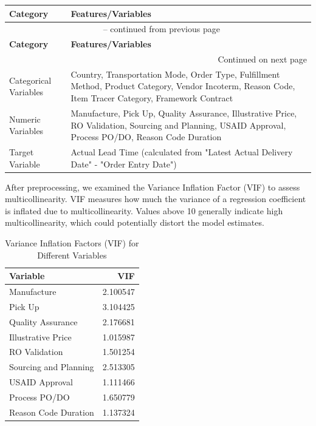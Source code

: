 \documentclass[12pt]{report}
\begin{document}
\begin{longtable}{|l|p{10cm}|}
\hline
\textbf{Category} & \textbf{Features/Variables} \\ \hline
\endfirsthead
\hline
\multicolumn{2}{|c|}{{\tablename~\thetable{} -- continued from previous page}} \\ \hline
\textbf{Category} & \textbf{Features/Variables} \\ \hline
\endhead
\hline \multicolumn{2}{|r|}{{Continued on next page}} \\ \hline
\endfoot
\hline
\endlastfoot
Categorical Variables & Country, Transportation Mode, Order Type, Fulfillment Method, Product Category, Vendor Incoterm, Reason Code, Item Tracer Category, Framework Contract \\ \hline
Numeric Variables & Manufacture, Pick Up, Quality Assurance, Illustrative Price, RO Validation, Sourcing and Planning, USAID Approval, Process PO/DO, Reason Code Duration \\ \hline
Target Variable & Actual Lead Time (calculated from "Latest Actual Delivery Date" - "Order Entry Date") \\ \hline
\end{longtable}

After preprocessing, we examined the Variance Inflation Factor (VIF) to assess multicollinearity. VIF measures how much the variance of a regression coefficient is inflated due to multicollinearity. Values above 10 generally indicate high multicollinearity, which could potentially distort the model estimates.

\begin{table}[h!]
\centering
\begin{tabular}{|l|r|}
\hline
\textbf{Variable} & \textbf{VIF} \\ \hline
Manufacture & 2.100547 \\ \hline
Pick Up & 3.104425 \\ \hline
Quality Assurance & 2.176681 \\ \hline
Illustrative Price & 1.015987 \\ \hline
RO Validation & 1.501254 \\ \hline
Sourcing and Planning & 2.513305 \\ \hline
USAID Approval & 1.111466 \\ \hline
Process PO/DO & 1.650779 \\ \hline
Reason Code Duration & 1.137324 \\ \hline
\end{tabular}
\caption{Variance Inflation Factors (VIF) for Different Variables}
\label{table:vif}
\end{table}
\end{document}
